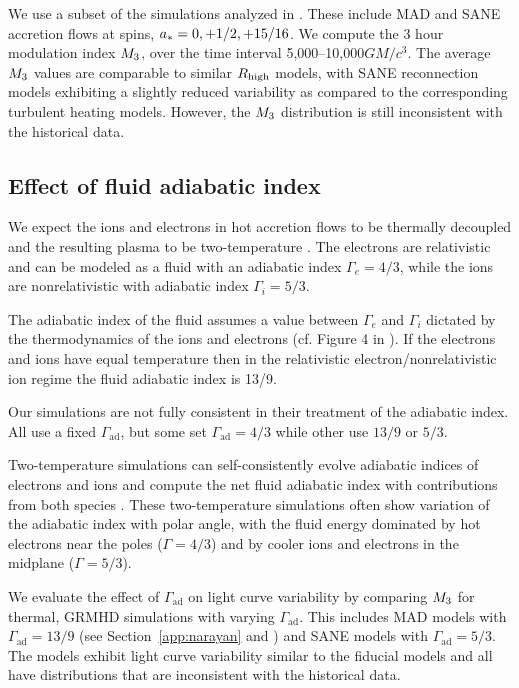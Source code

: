 We use a subset of the simulations analyzed in \citealt{2020MNRAS.494.4168D}.
These include MAD and SANE accretion flows at spins, $a_* = 0,+1/2,+15/16$.
We compute the 3 hour modulation index $M_{3}$, over the time interval 5,000--10,000$GM/c^{3}$.
The average $M_{3}$ values are comparable to similar $R_\mathrm{high}$ models, with SANE reconnection models exhibiting a slightly reduced variability as compared to the corresponding turbulent heating models.
However, the $M_{3}$ distribution is still inconsistent with the historical data.

\subsection{Effect of fluid adiabatic index}

We expect the ions and electrons in hot accretion flows to be thermally decoupled and the resulting plasma to be two-temperature \citep{1976ApJ...204..187S, Quataert_1998, 10.1093/mnras/stw3116, Ryan_2018, Chael2018}.
The electrons are relativistic and can be modeled as a fluid with an adiabatic index $\Gamma_{e}=4/3$, while the ions are nonrelativistic with adiabatic index $\Gamma_{i}=5/3$.

The adiabatic index of the fluid assumes a value between $\Gamma_{e}$ and $\Gamma_{i}$ dictated by the thermodynamics of the ions and electrons (cf. Figure 4 in \citealt{10.1093/mnras/stw3116}).
If the electrons and ions have equal temperature then in the relativistic electron/nonrelativistic ion regime the fluid adiabatic index is 13/9.

Our simulations are not fully consistent in their treatment of the adiabatic index.
All use a fixed $\Gamma_\mathrm{ad}$, but some set $\Gamma_\mathrm{ad} = 4/3$ while other use $13/9$ or $5/3$.

Two-temperature simulations can self-consistently evolve adiabatic indices of electrons and ions and compute the net fluid adiabatic index with contributions from both species \citep{10.1093/mnras/stw3116}.
These two-temperature simulations often show variation of the adiabatic index with polar angle, with the fluid energy dominated by hot electrons near the poles ($\Gamma = 4/3$) and by cooler ions and  electrons in the midplane ($\Gamma=5/3$).

We evaluate the effect of $\Gamma_\mathrm{ad}$ on light curve variability by comparing $M_{3}$ for thermal, GRMHD simulations with varying  $\Gamma_\mathrm{ad}$.
This includes MAD models with $\Gamma_\mathrm{ad}=13/9$ (see Section~\ref{app:narayan} and  \citealt{2022MNRAS.511.3795N}) and SANE models with $\Gamma_\mathrm{ad}=5/3$.
The models exhibit light curve variability similar to the fiducial models and all have  distributions that are inconsistent with the historical data.


